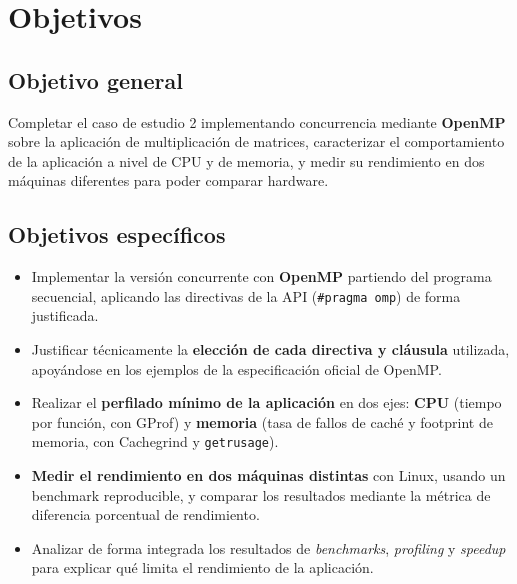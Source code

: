 \section{Objetivos}

\subsection{Objetivo general}

Completar el caso de estudio 2 implementando concurrencia mediante \textbf{OpenMP} sobre la aplicación de multiplicación de matrices, caracterizar el comportamiento de la aplicación a nivel de CPU y de memoria, y medir su rendimiento en dos máquinas diferentes para poder comparar hardware.

\subsection{Objetivos específicos}

\begin{itemize}
    \item Implementar la versión concurrente con \textbf{OpenMP} partiendo del programa secuencial, aplicando las directivas de la API (\texttt{\#pragma omp}) de forma justificada.
    \item Justificar técnicamente la \textbf{elección de cada directiva y cláusula} utilizada, apoyándose en los ejemplos de la especificación oficial de OpenMP.
    \item Realizar el \textbf{perfilado mínimo de la aplicación} en dos ejes: \textbf{CPU} (tiempo por función, con GProf) y \textbf{memoria} (tasa de fallos de caché y footprint de memoria, con Cachegrind y \texttt{getrusage}).
    \item \textbf{Medir el rendimiento en dos máquinas distintas} con Linux, usando un benchmark reproducible, y comparar los resultados mediante la métrica de diferencia porcentual de rendimiento.
    \item Analizar de forma integrada los resultados de \textit{benchmarks}, \textit{profiling} y \textit{speedup} para explicar qué limita el rendimiento de la aplicación.
\end{itemize}
